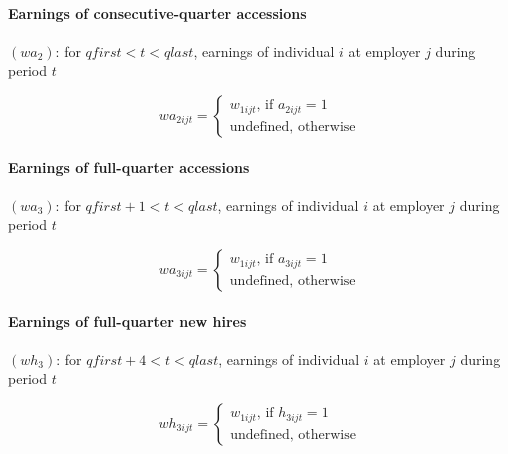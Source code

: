 \paragraph{Earnings of consecutive-quarter accessions}


$\left( wa_{2}\right) $: for $qfirst<t<qlast$, earnings of individual $i$ at
employer $j$ during period $t$

\begin{equation}
wa_{2ijt}=\left\{ 
\begin{array}{l}
{w_{1ijt}}\text{, if }{a_{2ijt}=1} \\ 
\text{{undefined, otherwise}}%
\end{array}%
\right.
\end{equation}

\paragraph{Earnings of full-quarter accessions}


$\left( wa_{3}\right) $: for $qfirst+1<t<qlast$, earnings of individual $i$
at employer $j$ during period $t$

\begin{equation}
wa_{3ijt}=\left\{ 
\begin{array}{l}
{w_{1ijt}}\text{, if }{a_{3ijt}=1} \\ 
\text{{undefined, otherwise}}%
\end{array}%
\right.
\end{equation}

\paragraph{Earnings of full-quarter new hires}


$\left( wh_{3}\right) $: for $qfirst+4<t<qlast$, earnings of individual $i$
at employer $j$ during period $t$

\begin{equation}
wh_{3ijt}=\left\{ 
\begin{array}{l}
{w_{1ijt}}\text{, if }{h_{3ijt}=1} \\ 
\text{{undefined, otherwise}}%
\end{array}%
\right.
\end{equation}

